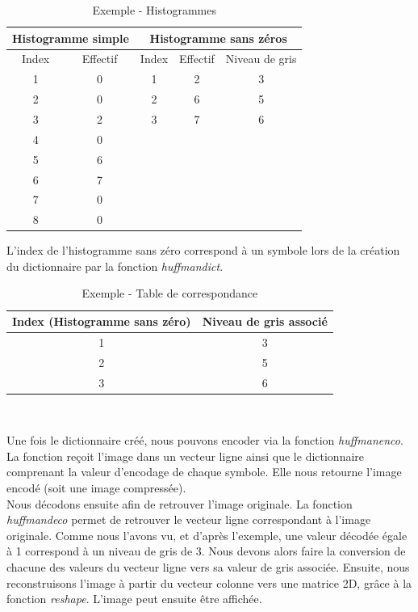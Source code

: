 \documentclass[a4paper, 12pt]{article}
\begin{document}
\begin{table}[!h]
	\centering
		\begin{tabular}{|c c|c c c|}
			\hline 
			\multicolumn{2}{|c|}{Histogramme simple} & \multicolumn{3}{|c|}{ Histogramme sans zéros } \\
			\hline Index & Effectif & Index & Effectif & Niveau de gris\\
			\hline
						1 & 0 & 1  & 2 & 3 \\
						2 & 0 & 2  & 6 & 5\\
						3 & 2 & 3  & 7 & 6\\
						4 & 0 &  & &  \\
						5 & 6 &  & &  \\
						6 & 7 &  & &  \\
						7 & 0 &  & & 	\\
						8 & 0 &  & & 	\\
			\hline
		\end{tabular}
	\caption{Exemple - Histogrammes}
	\label{tab:Histogrammes}
\end{table}

L'index de l'histogramme sans zéro correspond à un symbole lors de la création du dictionnaire par la fonction \textit{huffmandict}. \\

\begin{table}[!h]
	\centering
		\begin{tabular}{|c|c|}
			\hline 
				Index (Histogramme sans zéro) & Niveau de gris associé \\
			\hline 
				1 & 3 \\
				2 & 5 \\
				3 & 6 \\
			\hline
		\end{tabular} \\
	\caption{Exemple - Table de correspondance}
	\label{tab:TableDeCorrespondance}
\end{table}

Une fois le dictionnaire créé, nous pouvons encoder via la fonction \textit{huffmanenco}. La fonction reçoit l'image dans un vecteur ligne ainsi que le dictionnaire comprenant la valeur d'encodage de chaque symbole. Elle nous retourne l'image encodé (soit une image compressée). \\

Nous décodons ensuite afin de retrouver l'image originale. La fonction \textit{huffmandeco} permet de retrouver le vecteur ligne correspondant à l'image originale. Comme nous l'avons vu, et d'après l'exemple, une valeur décodée égale à 1 correspond à un niveau de gris de 3. Nous devons alors faire la conversion de chacune des valeurs du vecteur ligne vers sa valeur de gris associée. Ensuite, nous reconstruisons l'image à partir du vecteur colonne vers une matrice 2D, grâce à la fonction \textit{reshape}. L'image peut ensuite être affichée.\\
\end{document}
